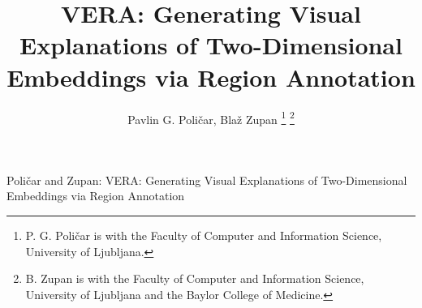 \documentclass[lettersize,journal]{IEEEtran}
\begin{document}
\title{VERA: Generating Visual Explanations of Two-Dimensional Embeddings via Region Annotation}

\author{Pavlin G. Poli\v{c}ar, Bla\v{z} Zupan
\thanks{P. G. Poli\v{c}ar is with the Faculty of Computer and Information Science, University of Ljubljana.}%
\thanks{B. Zupan is with the Faculty of Computer and Information Science, University of Ljubljana and the Baylor College of Medicine.}}

\markboth{}%
{Poli\v{c}ar and Zupan: VERA: Generating Visual Explanations of Two-Dimensional Embeddings via Region Annotation}

\IEEEpubid{}

\maketitle
\end{document}
